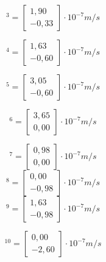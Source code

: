 \documentclass{article} %
\begin{document}
 \begin{equation}
[v]^{3}=\begin{bmatrix}
1,90\\
-0,33
\end{bmatrix}\cdot 10^{-7}m/s
\end{equation}

 \begin{equation}
[v]^{4}=\begin{bmatrix}
1,63\\
-0,60
\end{bmatrix}\cdot 10^{-7}m/s
\end{equation}

 \begin{equation}
[v]^{5}=\begin{bmatrix}
3,05\\
-0,60
\end{bmatrix}\cdot 10^{-7}m/s
\end{equation}

 \begin{equation}
[v]^{6}=\begin{bmatrix}
3,65\\
0,00
\end{bmatrix}\cdot 10^{-7}m/s
\end{equation}

 \begin{equation}
[v]^{7}=\begin{bmatrix}
0,98\\
0,00
\end{bmatrix}\cdot 10^{-7}m/s
\end{equation}
 \begin{equation}
[v]^{8}=\begin{bmatrix}
0,00\\
-0,98
\end{bmatrix}\cdot 10^{-7}m/s
\end{equation}
 \begin{equation}
[v]^{9}=\begin{bmatrix}
1,63\\
-0,98
\end{bmatrix}\cdot 10^{-7}m/s
\end{equation}

 \begin{equation}
[v]^{10}=\begin{bmatrix}
0,00\\
-2,60
\end{bmatrix}\cdot 10^{-7}m/s
\end{equation}
\end{document}
